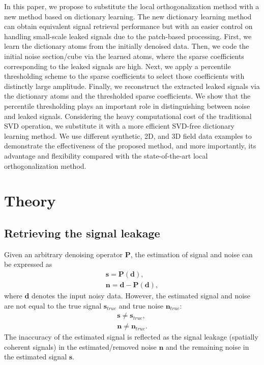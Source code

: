 In this paper, we propose to substitute the local orthogonalization method with a new method based on dictionary learning. The new dictionary learning method can obtain equivalent signal retrieval performance but with an easier control on handling small-scale leaked signals due to the patch-based processing. First, we learn the dictionary atoms from the initially denoised data. Then, we code the initial noise section/cube via the learned atoms, where the sparse coefficients corresponding to the leaked signals are high. Next, we apply a percentile thresholding scheme to the sparse coefficients to select those coefficients with distinctly large amplitude. Finally, we reconstruct the extracted leaked signals via the dictionary atoms and the thresholded sparse coefficients. We show that the percentile thresholding plays an important role in distinguishing between noise and leaked signals. Considering the heavy computational cost of the traditional SVD operation, we substitute it with a more efficient SVD-free dictionary learning method. We use different synthetic, 2D, and 3D field data examples to demonstrate the effectiveness of the proposed method, and more importantly, its advantage and flexibility compared with the state-of-the-art local orthogonalization method.

\section{Theory}
\subsection{Retrieving the signal leakage}
Given an arbitrary denoising operator $\mathbf{P}$, the estimation of signal and noise can be expressed as
\begin{align}
\label{eq:sn1}
\mathbf{s} = \mathbf{P}(\mathbf{d}), \\
\label{eq:sn2}
\mathbf{n} = \mathbf{d} - \mathbf{P}(\mathbf{d}),
\end{align}
where $\mathbf{d}$ denotes the input noisy data. However, the estimated signal and noise are not equal to the true signal $\mathbf{s}_{true}$ and true noise $\mathbf{n}_{true}$:
\begin{align}
\label{eq:sn1}
\mathbf{s} \ne \mathbf{s}_{true}, \\
\label{eq:sn2}
\mathbf{n} \ne \mathbf{n}_{true}.
\end{align}
The inaccuracy of the estimated signal is reflected as the signal leakage (spatially coherent signals) in the estimated/removed noise $\mathbf{n}$ and the remaining noise in the estimated signal $\mathbf{s}$. 

